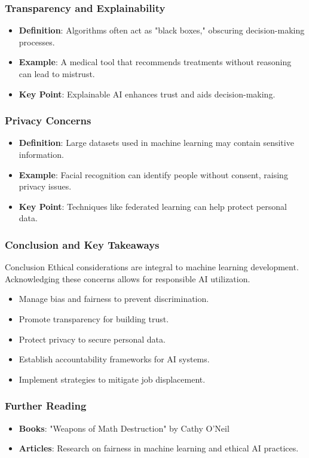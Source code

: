 \documentclass[aspectratio=169]{beamer}
\begin{document}
\begin{frame}[fragile]
  \frametitle{Transparency and Explainability}
  \begin{itemize}
    \item \textbf{Definition}: Algorithms often act as "black boxes," obscuring decision-making processes.
    \item \textbf{Example}: A medical tool that recommends treatments without reasoning can lead to mistrust.
    \item \textbf{Key Point}: Explainable AI enhances trust and aids decision-making.
  \end{itemize}
\end{frame}

\begin{frame}[fragile]
  \frametitle{Privacy Concerns}
  \begin{itemize}
    \item \textbf{Definition}: Large datasets used in machine learning may contain sensitive information.
    \item \textbf{Example}: Facial recognition can identify people without consent, raising privacy issues.
    \item \textbf{Key Point}: Techniques like federated learning can help protect personal data.
  \end{itemize}
\end{frame}

\begin{frame}[fragile]
  \frametitle{Conclusion and Key Takeaways}
  \begin{block}{Conclusion}
    Ethical considerations are integral to machine learning development. Acknowledging these concerns allows for responsible AI utilization.
  \end{block}
  
  \begin{itemize}
    \item Manage bias and fairness to prevent discrimination.
    \item Promote transparency for building trust.
    \item Protect privacy to secure personal data.
    \item Establish accountability frameworks for AI systems.
    \item Implement strategies to mitigate job displacement.
  \end{itemize}
\end{frame}

\begin{frame}[fragile]
  \frametitle{Further Reading}
  \begin{itemize}
    \item \textbf{Books}: "Weapons of Math Destruction" by Cathy O’Neil
    \item \textbf{Articles}: Research on fairness in machine learning and ethical AI practices.
  \end{itemize}
\end{frame}
\end{document}
